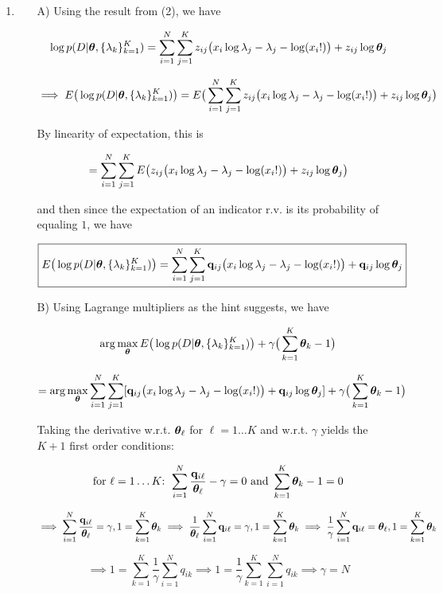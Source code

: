 \documentclass[submit]{harvardml}
\begin{document}
\begin{enumerate}
\item 
\begin{enumerate}
\item[A)] Using the result from (2), we have

$$ \log p(D | \boldsymbol{\theta}, \{\lambda_k\}^K_{k=1})  = \sum_{i=1}^N \sum_{j=1}^K z_{ij} \big(x_i\log\lambda_{j} -\lambda_{j} - \log(x_i!)\big) + z_{ij} \log\boldsymbol{\theta}_{j} $$ 

$$\implies  E\big(\log p(D | \boldsymbol{\theta}, \{\lambda_k\}^K_{k=1}) \big) = E\big(\sum_{i=1}^N \sum_{j=1}^K z_{ij} \big(x_i\log\lambda_{j} -\lambda_{j} - \log(x_i!)\big) + z_{ij} \log\boldsymbol{\theta}_{j}\big) $$ 

By linearity of expectation, this is 

$$ = \sum_{i=1}^N \sum_{j=1}^K E\big(z_{ij} \big(x_i\log\lambda_{j} -\lambda_{j} - \log(x_i!)\big) + z_{ij} \log\boldsymbol{\theta}_{j}\big) $$

and then since the expectation of an indicator r.v. is its probability of equaling $1$, we have

$$\boxed{ E\big(\log p(D | \boldsymbol{\theta}, \{\lambda_k\}^K_{k=1}) \big) =  \sum_{i=1}^N \sum_{j=1}^K \mathbf{q}_{ij} \big(x_i\log\lambda_{j} -\lambda_{j} - \log(x_i!)\big) + \mathbf{q}_{ij} \log\boldsymbol{\theta}_{j} } $$

\item[B)] Using Lagrange multipliers as the hint suggests, we have

$$ \arg\max_{\boldsymbol{\theta}} E\big(\log p(D | \boldsymbol{\theta}, \{\lambda_k\}^K_{k=1}) \big) + \gamma \big(\sum_{k=1}^K \boldsymbol{\theta}_k - 1\big)$$

$$=  \arg\max_{\boldsymbol{\theta}} \sum_{i=1}^N \sum_{j=1}^K [\mathbf{q}_{ij} \big(x_i\log\lambda_{j} -\lambda_{j} - \log(x_i!)\big) + \mathbf{q}_{ij} \log\boldsymbol{\theta}_{j}] + \gamma \big(\sum_{k=1}^K \boldsymbol{\theta}_k - 1\big)$$

Taking the derivative w.r.t. $\boldsymbol{\theta}_\ell$ for $\ell = 1 \dots K$ and w.r.t. $\gamma$ yields the $K+1$ first order conditions:

$$\textrm{for $\ell = 1 \dots K$: } \sum_{i=1}^N  \frac{\mathbf{q}_{i\ell}}{\boldsymbol{\theta}_\ell} - \gamma = 0 \textrm{ and }   \sum_{k=1}^K \boldsymbol{\theta}_k- 1 = 0$$

$$\implies \sum_{i=1}^N  \frac{\mathbf{q}_{i\ell}}{\boldsymbol{\theta}_\ell} = \gamma, 1 = \sum_{k=1}^K \boldsymbol{\theta}_k \implies \frac{1}{\boldsymbol{\theta}_\ell} \sum_{i=1}^N \mathbf{q}_{i\ell} = \gamma, 1 = \sum_{k=1}^K \boldsymbol{\theta}_k \implies \frac{1}{\gamma} \sum_{i=1}^N \mathbf{q}_{i\ell} = \boldsymbol{\theta}_\ell, 1 = \sum_{k=1}^K \boldsymbol{\theta}_k $$

$$ \implies  1 =  \sum_{k=1}^K \frac{1}{\gamma} \sum_{i=1}^N q_{ik} \implies  1 =  \frac{1}{\gamma} \sum_{k=1}^K  \sum_{i=1}^N q_{ik} \implies\gamma = N$$


\end{enumerate}
\end{enumerate}
\end{document}
